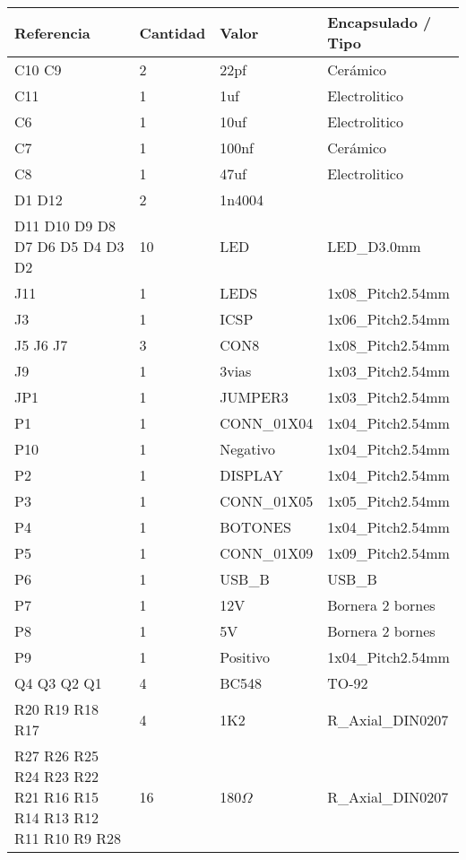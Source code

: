 \begin{table}[htb]
	\begin{tabular}{|p{}|p{}|p{}|p{}|}
		\hline
		\textbf{Referencia} & \multicolumn{1}{l|}{\textbf{Cantidad}} & \textbf{Valor} & \textbf{Encapsulado} / Tipo \\ \hline
		C10 C9 & 2 & 22pf & Cerámico \\ \hline
		C11 & 1 & 1uf & Electrolitico \\ \hline
		C6 & 1 & 10uf & Electrolitico \\ \hline
		C7 & 1 & 100nf & Cerámico \\ \hline
		C8 & 1 & 47uf & Electrolitico \\ \hline
		D1 D12 & 2 & 1n4004 &  \\ \hline
		D11 D10 D9 D8 D7 D6 D5 
		D4 D3 D2 & 10 & LED & LED\_D3.0mm \\ \hline
		J11 & 1 & LEDS & 1x08\_Pitch2.54mm \\ \hline
		J3 & 1 & ICSP & 1x06\_Pitch2.54mm \\ \hline
		J5 J6 J7 & 3 & CON8 & 1x08\_Pitch2.54mm \\ \hline
		J9 & 1 & 3vias & 1x03\_Pitch2.54mm \\ \hline
		JP1 & 1 & JUMPER3 & 1x03\_Pitch2.54mm \\ \hline
		P1 & 1 & CONN\_01X04 & 1x04\_Pitch2.54mm \\ \hline
		P10 & 1 & Negativo & 1x04\_Pitch2.54mm \\ \hline
		P2 & 1 & DISPLAY & 1x04\_Pitch2.54mm \\ \hline
		P3 & 1 & CONN\_01X05 & 1x05\_Pitch2.54mm \\ \hline
		P4 & 1 & BOTONES & 1x04\_Pitch2.54mm \\ \hline
		P5 & 1 & CONN\_01X09 & 1x09\_Pitch2.54mm \\ \hline
		P6 & 1 & USB\_B & USB\_B \\ \hline
		P7 & 1 & 12V & Bornera 2 bornes \\ \hline
		P8 & 1 & 5V & Bornera 2 bornes \\ \hline
		P9 & 1 & Positivo & 1x04\_Pitch2.54mm \\ \hline
		Q4 Q3 Q2 Q1 & 4 & BC548 & TO-92 \\ \hline
		R20 R19 R18 R17 & 4 & 1K2 & R\_Axial\_DIN0207 \\ \hline
		R27 R26 R25 R24 R23 R22 
		R21 R16 R15 R14 R13 R12 
		R11 R10 R9 R28 & 16 & 180$\Omega$ & R\_Axial\_DIN0207 \\ \hline

\end{tabular}
\end{table}
